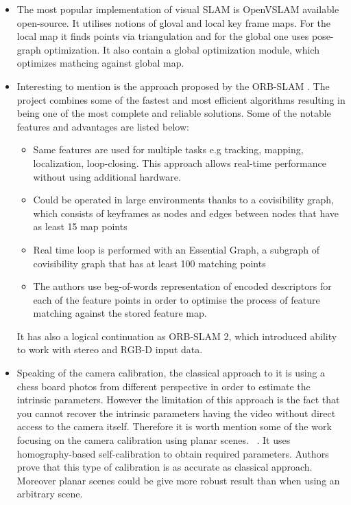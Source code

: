 \begin{itemize}
    \item The most popular implementation of visual SLAM is OpenVSLAM available open-source. It utilises notions of gloval and local key frame maps. For the local map it finds points via triangulation and for the global one uses pose-graph optimization. It also contain a global optimization module, which optimizes mathcing against global map. ~\cite{OpenVSLAM}
    \item Interesting to mention is the approach proposed by the ORB-SLAM \cite{ORB_SLAM}.
    The project combines some of the fastest and most efficient algorithms resulting in being one of the most complete and reliable solutions. Some of the notable features and advantages are listed below:
    \begin{itemize}
        \item Same features are used for multiple tasks e.g tracking, mapping, localization, loop-closing. This approach allows real-time performance without using additional hardware.
        \item Could be operated in large environments thanks to a covisibility graph, which consists of keyframes as nodes and edges between nodes that have as least 15 map points 
        \item Real time loop is performed with an Essential Graph, a subgraph of covisibility graph that has at least 100 matching points
        \item The authors use beg-of-words representation of encoded descriptors for each of the feature points in order to optimise the process of feature matching against the stored feature map.
    \end{itemize} It has also a logical continuation as ORB-SLAM 2, which introduced ability to work with stereo and RGB-D input data. ~\cite{ORB_SLAM2}
    \item Speaking of the camera calibration, the classical approach to it is using a chess board photos from different perspective in order to estimate the intrinsic parameters. However the limitation of this approach is the fact that you cannot recover the intrinsic parameters having the video without direct access to the camera itself. Therefore it is worth mention some of the work focusing on the camera calibration using planar scenes. ~\cite{Self_Calibration}. It uses homography-based self-calibration to obtain required parameters. Authors prove that this type of calibration is as accurate as classical approach. Moreover planar scenes could be give  more robust result than when using an arbitrary scene.

\end{itemize}
